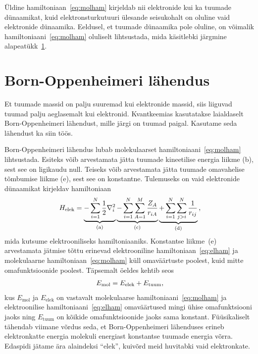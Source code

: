 \documentclass[12pt]{report}
\begin{document}
Üldine hamiltoniaan~\eqref{eq:molham} kirjeldab nii elektronide kui ka tuumade dünaamikat, kuid elektronsturkutuuri ülesande seisukohalt on oluline vaid elektronide dünaamika.
Eeldusel, et tuumade dünaamika pole oluline, on võimalik hamiltoniaani~\eqref{eq:molham} oluliselt lihtsustada, mida käsitlebki järgmine alapeatükk~\ref{sec:bornopen}.

\section{Born-Oppenheimeri lähendus}\label{sec:bornopen}

Et tuumade massid on palju suuremad kui elektronide massid, siis liiguvad tuumad palju aeglasemalt kui elektronid.
Kvantkeemias kasutatakse laialdaselt Born-Oppenheimeri lähendust, mille järgi on tuumad paigal.
Kasutame seda lähendust ka siin töös.

Born-Oppenheimeri lähendus lubab molekulaarset hamiltoniaani~\eqref{eq:molham} lihtsustada.
Esiteks võib arvestamata jätta tuumade kineetilise energia liikme (b), sest see on ligikaudu null.
Teiseks võib arvestamata jätta tuumade omavahelise tõmbumise liikme (e), sest see on konstantne.
Tulemuseks on vaid elektronide dünaamikat kirjeldav hamiltoniaan
\begin{align}\label{eq:elham}
    H_\text{elek} =
    \underbrace{- \sum_{i = 1}^N \frac{1}{2} \nabla_i^2}_\text{(a)}
    \underbrace{- \sum_{i = 1}^N \sum_{A = 1}^M \frac{Z_A}{r_{iA}}}_\text{(c)}
    \underbrace{+ \sum_{i = 1}^N \sum_{j > i}^N \frac{1}{r_{ij}}}_\text{(d)} \rlap{,}
\end{align}
mida kutsume elektrooniliseks hamiltoniaaniks.
Konstantse liikme~(e) arvestamata jätmise tõttu erinevad elektrooniline hamiltoniaan~\eqref{eq:elham} ja molekulaarne hamiltoniaan~\eqref{eq:molham} küll omaväärtuste poolest, kuid mitte omafunktsioonide poolest.
Täpsemalt öeldes kehtib seos
\begin{align}\label{eq:eigenelvsmol}
    E_\text{mol} = E_\text{elek} + E_\text{tuum} \rlap{,}
\end{align}
kus \(E_\text{mol}\) ja \(E_\text{elek}\) on vastavalt molekulaarse hamiltoniaani~\eqref{eq:molham} ja elektroonilise hamiltoniaani~\eqref{eq:elham} omaväärtused mingi ühise omafunktsiooni jaoks	 ning \(E_\text{tuum}\) on kõikide omafunktsioonide jaoks sama konstant.
Füüsikaliselt tähendab viimane võrdus seda, et Born-Oppenheimeri lähenduses erineb elektronkatte energia molekuli energiast konstantse tuumade energia võrra.
Edaspidi jätame ära alaindeksi ``elek'', kuivõrd meid huvitabki vaid elektronkate.
\end{document}
